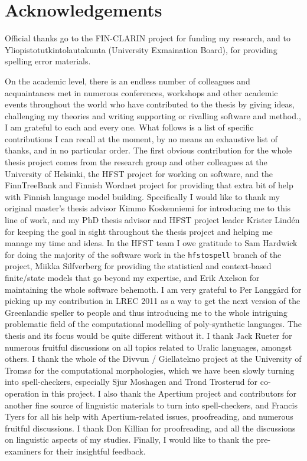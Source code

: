 \documentclass[officiallayout,final]{unihelcompling}
\begin{document}
\section*{Acknowledgements}
\label{sec:acknowledgements}

Official thanks go to the FIN-CLARIN project for funding my research, and to
Yliopistotutkintolautakunta (University Exmaination Board), for providing
spelling error materials.

On the academic level, there is an endless number of colleagues and
acquaintances met in numerous conferences, workshops and other academic events
throughout the world who have contributed to the thesis by giving ideas,
challenging my theories and writing supporting or rivalling software and
method., I am grateful to each and every one. What follows is a list of
specific contributions I can recall at the moment, by no means an exhaustive
list of thanks, and in no particular order.  The first obvious contribution for
the whole thesis project comes from the research group and other colleagues at
the University of Helsinki, the HFST project for working on software, and the
FinnTreeBank and Finnish Wordnet project for providing that extra bit of help
with Finnish language model building. Specifically I would like to thank my
original master's thesis advisor Kimmo Koskenniemi for introducing me to this
line of work, and my PhD thesis advisor and HFST project leader Krister Lindén
for keeping the goal in sight throughout the thesis project and helping me
manage my time and ideas.  In the HFST team I owe gratitude to Sam Hardwick for
doing the majority of the software work in the \texttt{hfstospell} branch of
the project, Miikka Silfverberg for providing the statistical and context-based
finite\-/state models that go beyond my expertise, and Erik Axelson for
maintaining the whole software behemoth.  I am very grateful to Per Langgård
for picking up my contribution in LREC 2011 as a way to get the next version of
the Greenlandic speller to people and thus introducing me to the whole
intriguing problematic field of the computational modelling of poly-synthetic
languages. The thesis and its focus would be quite different without it.  I
thank Jack Rueter for numerous fruitful discussions on all topics related to
Uralic languages, amongst others.  I thank the whole of the Divvun /
Giellatekno project at the University of Tromsø for the computational
morphologies, which we have been slowly turning into spell-checkers, especially
Sjur Moshagen and Trond Trosterud for co-operation in this project. I also
thank the Apertium project and contributors for another fine source of
linguistic materials to turn into spell-checkers, and Francis Tyers for all his
help with Apertium-related issues, proofreading, and numerous fruitful
discussions. I thank Don Killian for proofreading, and all the discussions on
linguistic aspects of my studies. Finally, I would like to thank the
pre-examiners for their insightful feedback.
\end{document}
